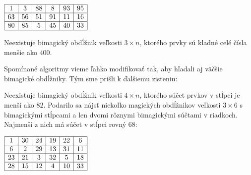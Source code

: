 \begin{center}
$\begin{array}{ |c|c|c|c|c|c| } 
\hline
1 & 3 & 88 & 8 & 93 & 95 \\ 
\hline
63 & 56 & 51 & 91 & 11 & 16 \\ 
\hline
80 & 85 & 5 & 45 & 40 & 33 \\ 
\hline
\end{array}$
\end{center}

\begin{result} Neexistuje bimagický obdĺžnik veľkosti $3 \times n$, ktorého prvky sú kladné celé čísla menšie ako $400$.
\end{result} 

Spomínané algoritmy vieme ľahko modifikovať tak, aby hľadali aj väčšie bimagické obdĺžniky. Tým sme prišli k ďalšiemu zisteniu:

\begin{result} Neexistuje bimagický obdĺžnik veľkosti $4 \times n$, ktorého súčet prvkov v stĺpci je menší ako $82$. Podarilo sa nájsť niekoľko magických obdĺžnikov veľkosti $3 \times 6$ s bimagickými stĺpcami a len dvomi rôznymi bimagickými súčtami v riadkoch. Najmenší z nich má súčet v stĺpci rovný $68$:
\end{result}

\begin{center}
$\begin{array}{ |c|c|c|c|c|c| } 
\hline
1 & 30 & 24 & 19 & 22 & 6 \\ 
\hline
6 & 2 & 29 & 13 & 31 & 11 \\ 
\hline
23 & 21 & 3 & 32 & 5 & 18 \\ 
\hline
28 & 15 & 12 & 4 & 10 & 33 \\ 
\hline
\end{array}$
\end{center}



